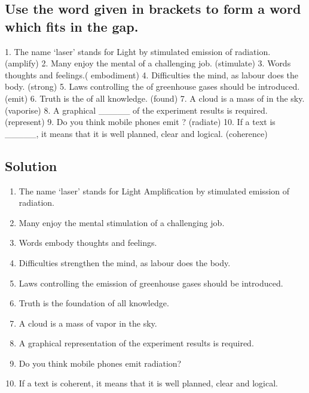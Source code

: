 \subsection*{Use the word given in brackets to form a word which fits in the gap.}
1. The name ‘laser’ stands for Light \underline{\hspace{2cm}} by stimulated emission of radiation.
(amplify) 2. Many enjoy the mental \underline{\hspace{2cm}} of a challenging job. (stimulate) 3.
Words \underline{\hspace{2cm}} thoughts and feelings.( embodiment) 4. Difficulties \underline{\hspace{2cm}} the
mind, as labour does the body. (strong) 5. Laws controlling the \underline{\hspace{2cm}} of greenhouse
gases should be introduced. (emit) 6. Truth is the \underline{\hspace{2cm}} of all knowledge. (found)
7. A cloud is a mass of \underline{\hspace{2cm}} in the sky. (vaporise) 8. A graphical \_\_\_\_\_
of the experiment results is required. (represent) 9. Do you think mobile phones
emit \underline{\hspace{2cm}} ? (radiate) 10. If a text is \_\_\_\_\_, it means that it is well
planned, clear and logical. (coherence)

\subsection*{Solution}
\begin{enumerate}
      \item The name ‘laser’ stands for Light Amplification by stimulated emission of
            radiation.
      \item Many enjoy the mental stimulation of a challenging job.
      \item Words embody thoughts and feelings.
      \item Difficulties strengthen the mind, as labour does the body.
      \item Laws controlling the emission of greenhouse gases should be introduced.
      \item Truth is the foundation of all knowledge.
      \item A cloud is a mass of vapor in the sky.
      \item A graphical representation of the experiment results is required.
      \item Do you think mobile phones emit radiation?
      \item If a text is coherent, it means that it is well planned, clear and logical.
\end{enumerate}

